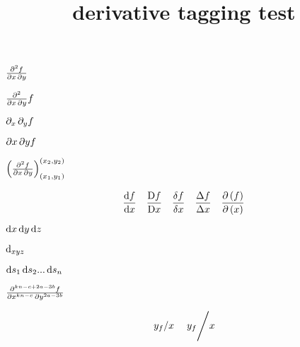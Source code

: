 \documentclass{article}
\title{derivative tagging test}
\begin{document}
$\pdv{f}{x,y}$

$\pdv*{f}{x,y}$

$\pdv{f}!{x,y}$

$\pdv{f}/!{x,y}$

$\pdv{f}{x,y}_{(x_1,y_1)}^{(x_2,y_2)}$

\[\odv{f}{x} \quad \mdv{f}{x} \quad \fdv{f}{x} \quad \adv{f}{x} \quad \jdv{f}{x}\]

$\odif{x,y,z}$

$\odif*[sep-var-var=0]{x,y,z}$

$\odif{s_1,s_2...,s_n}$

$\pdv[sort-method=symbol, order={kn-c,2a-3b}]{f}{x,y}$

\[\slashfrac{y_f}{x} \quad \slashfrac[Bigg]{y_f}{x}\]
\end{document}
